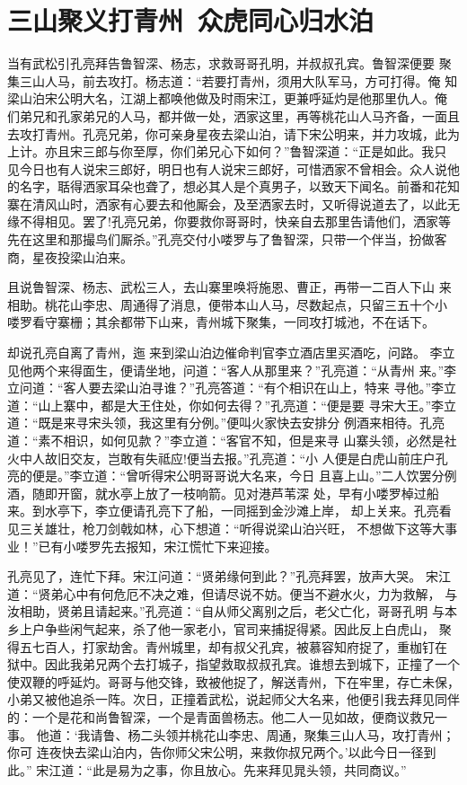\chapter{三山聚义打青州~众虎同心归水泊}

当有武松引孔亮拜告鲁智深、杨志，求救哥哥孔明，并叔叔孔宾。鲁智深便要
聚集三山人马，前去攻打。杨志道：“若要打青州，须用大队军马，方可打得。俺
知梁山泊宋公明大名，江湖上都唤他做及时雨宋江，更兼呼延灼是他那里仇人。俺
们弟兄和孔家弟兄的人马，都并做一处，洒家这里，再等桃花山人马齐备，一面且
去攻打青州。孔亮兄弟，你可亲身星夜去梁山泊，请下宋公明来，并力攻城，此为
上计。亦且宋三郎与你至厚，你们弟兄心下如何？”鲁智深道：“正是如此。我只
见今日也有人说宋三郎好，明日也有人说宋三郎好，可惜洒家不曾相会。众人说他
的名字，聒得洒家耳朵也聋了，想必其人是个真男子，以致天下闻名。前番和花知
寨在清风山时，洒家有心要去和他厮会，及至洒家去时，又听得说道去了，以此无
缘不得相见。罢了!孔亮兄弟，你要救你哥哥时，快亲自去那里告请他们，洒家等
先在这里和那撮鸟们厮杀。”孔亮交付小喽罗与了鲁智深，只带一个伴当，扮做客
商，星夜投梁山泊来。

且说鲁智深、杨志、武松三人，去山寨里唤将施恩、曹正，再带一二百人下山
来相助。桃花山李忠、周通得了消息，便带本山人马，尽数起点，只留三五十个小
喽罗看守寨栅；其余都带下山来，青州城下聚集，一同攻打城池，不在话下。

却说孔亮自离了青州，迤来到梁山泊边催命判官李立酒店里买酒吃，问路。
李立见他两个来得面生，便请坐地，问道：“客人从那里来？”孔亮道：“从青州
来。”李立问道：“客人要去梁山泊寻谁？”孔亮答道：“有个相识在山上，特来
寻他。”李立道：“山上寨中，都是大王住处，你如何去得？”孔亮道：“便是要
寻宋大王。”李立道：“既是来寻宋头领，我这里有分例。”便叫火家快去安排分
例酒来相待。孔亮道：“素不相识，如何见款？”李立道：“客官不知，但是来寻
山寨头领，必然是社火中人故旧交友，岂敢有失祗应!便当去报。”孔亮道：“小
人便是白虎山前庄户孔亮的便是。”李立道：“曾听得宋公明哥哥说大名来，今日
且喜上山。”二人饮罢分例酒，随即开窗，就水亭上放了一枝响箭。见对港芦苇深
处，早有小喽罗棹过船来。到水亭下，李立便请孔亮下了船，一同摇到金沙滩上岸，
却上关来。孔亮看见三关雄壮，枪刀剑戟如林，心下想道：“听得说梁山泊兴旺，
不想做下这等大事业！”已有小喽罗先去报知，宋江慌忙下来迎接。

孔亮见了，连忙下拜。宋江问道：“贤弟缘何到此？”孔亮拜罢，放声大哭。
宋江道：“贤弟心中有何危厄不决之难，但请尽说不妨。便当不避水火，力为救解，
与汝相助，贤弟且请起来。”孔亮道：“自从师父离别之后，老父亡化，哥哥孔明
与本乡上户争些闲气起来，杀了他一家老小，官司来捕捉得紧。因此反上白虎山，
聚得五七百人，打家劫舍。青州城里，却有叔父孔宾，被慕容知府捉了，重枷钉在
狱中。因此我弟兄两个去打城子，指望救取叔叔孔宾。谁想去到城下，正撞了一个
使双鞭的呼延灼。哥哥与他交锋，致被他捉了，解送青州，下在牢里，存亡未保，
小弟又被他追杀一阵。次日，正撞着武松，说起师父大名来，他便引我去拜见同伴
的：一个是花和尚鲁智深，一个是青面兽杨志。他二人一见如故，便商议救兄一事。
他道：‘我请鲁、杨二头领并桃花山李忠、周通，聚集三山人马，攻打青州；你可
连夜快去梁山泊内，告你师父宋公明，来救你叔兄两个。’以此今日一径到此。”
宋江道：“此是易为之事，你且放心。先来拜见晁头领，共同商议。”

